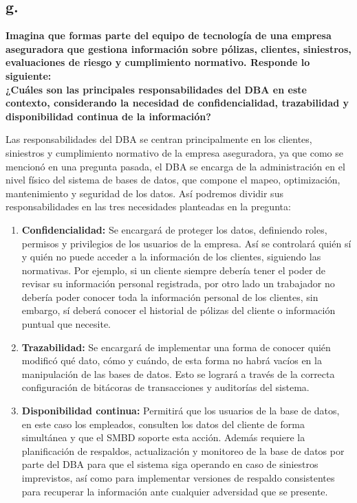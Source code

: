 
\subsection*{g.}

\textbf{Imagina que formas parte del equipo de tecnología de una empresa aseguradora que gestiona información sobre pólizas, clientes, siniestros, evaluaciones de riesgo y cumplimiento normativo. Responde lo siguiente:}\\
\textbf{¿Cuáles son las principales responsabilidades del DBA en este contexto, considerando la necesidad de confidencialidad, trazabilidad y disponibilidad continua de la información?}

Las responsabilidades del DBA se centran principalmente en los clientes, siniestros y cumplimiento normativo de la empresa aseguradora, ya que como se mencionó en una pregunta pasada, el DBA se encarga de la administración en el nivel físico del sistema de bases de datos, que compone el mapeo, optimización, mantenimiento y seguridad de los datos. Así podremos dividir sus responsabilidades en las tres necesidades planteadas en la pregunta:

\begin{enumerate}
    \item \textbf{Confidencialidad:} Se encargará de proteger los datos, definiendo roles, permisos y privilegios de los usuarios de la empresa. Así se controlará quién sí y quién no puede acceder a la información de los clientes, siguiendo las normativas. Por ejemplo, si un cliente siempre debería tener el poder de revisar su información personal registrada, por otro lado un trabajador no debería poder conocer toda la información personal de los clientes, sin embargo, sí deberá conocer el historial de pólizas del cliente o información puntual que necesite.
    
    \item \textbf{Trazabilidad:} Se encargará de implementar una forma de conocer quién modificó qué dato, cómo y cuándo, de esta forma no habrá vacíos en la manipulación de las bases de datos. Esto se logrará a través de la correcta configuración de bitácoras de transacciones y auditorías del sistema.
    
    \item \textbf{Disponibilidad continua:} Permitirá que los usuarios de la base de datos, en este caso los empleados, consulten los datos del cliente de forma simultánea y que el SMBD soporte esta acción. Además requiere la planificación de respaldos, actualización y monitoreo de la base de datos por parte del DBA para que el sistema siga operando en caso de siniestros imprevistos, así como para implementar versiones de respaldo consistentes para recuperar la información ante cualquier adversidad que se presente.
\end{enumerate}

